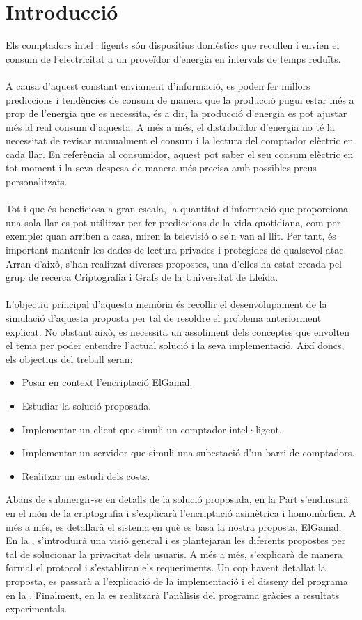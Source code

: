 \documentclass{article}
\begin{document}
\part{Introducció}
Els comptadors intel·ligents són dispositius domèstics que recullen i envien 
el consum de l'electricitat a un proveïdor d’energia en intervals de temps reduïts.
\\
\\
A causa d'aquest constant enviament d'informació,
es poden fer millors prediccions i tendències de consum de manera que la producció pugui estar més a prop de l'energia que es necessita, és a dir, la producció d'energia es pot ajustar més al real consum d'aquesta. A més a més, el distribuïdor d'energia no té la necessitat de revisar manualment el consum i la lectura del comptador elèctric en cada llar. En referència al consumidor, aquest pot saber el seu consum elèctric en tot moment i la seva despesa de manera més precisa amb possibles preus personalitzats.
\\
\\
Tot i que és beneficiosa a gran escala, la quantitat d'informació que proporciona una sola llar es pot utilitzar per fer prediccions de la vida quotidiana, com per exemple: quan arriben a casa, miren la televisió o se'n van al llit. Per tant, és important mantenir les dades de lectura privades i protegides de qualsevol atac. Arran d'això, s'han realitzat diverses propostes, una d'elles ha estat creada pel grup de recerca Criptografia i Grafs de la Universitat de Lleida.
\\\\
L'objectiu principal d'aquesta memòria és recollir el desenvolupament de la simulació d'aquesta proposta per tal de resoldre el problema anteriorment explicat. No obstant això, es necessita un assoliment dels conceptes que envolten el tema per poder entendre l'actual solució i la seva implementació. Així doncs, els objectius del treball seran:
\begin{itemize}
	\item Posar en context l'encriptació ElGamal.
	\item Estudiar la solució proposada.
	\item Implementar un client que simuli un comptador intel·ligent.
	\item Implementar un servidor que simuli una subestació d'un barri de comptadors.
	\item Realitzar un estudi dels costs.
\end{itemize}
Abans de submergir-se en detalls de la solució proposada, en la Part  s'endinsarà en el món de la criptografia i s'explicarà l'encriptació asimètrica i homomòrfica. A més a més, es detallarà el sistema en què es basa la nostra proposta, ElGamal. En la ,  s'introduirà una visió general i es plantejaran les diferents propostes per tal de solucionar la privacitat dels usuaris. A més a més, s'explicarà de manera formal el protocol i s'establiran els requeriments. Un cop havent detallat la proposta, es passarà a l'explicació de la implementació i el disseny del programa en la . Finalment, en la  es realitzarà l'anàlisis del programa gràcies a resultats experimentals.
\end{document}
